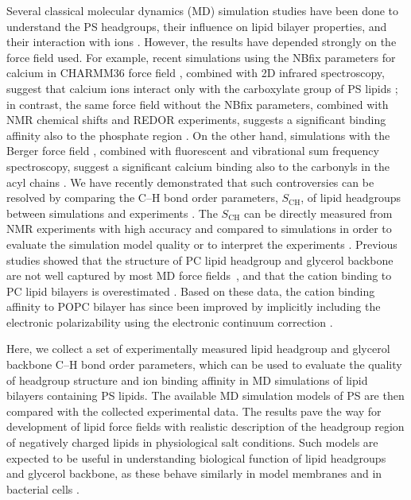 \documentclass[aps,prl,superscriptaddress,twocolumn]{revtex4}
\begin{document}
Several classical molecular dynamics (MD) simulation studies have been done
to understand the PS headgroups, their influence on lipid bilayer properties, and their
interaction with
ions \cite{cascales96,pandit02,mukhopadhyay04,pedersen06,vernier09,boettcher11,molina12,jurkiewicz12,venable13,pan14,vangaveti14,melcrova16,valentine18,hallock18}.
However, the results have depended strongly on the force field used.
For example, recent simulations using the NBfix parameters for calcium \cite{kim16} in
CHARMM36 force field \cite{klauda10,venable13}, combined with 2D infrared spectroscopy,
suggest that calcium ions interact only with the carboxylate group of PS lipids \cite{valentine18}; in contrast,
the same force field without the NBfix parameters, combined with NMR chemical shifts and
REDOR  experiments, suggests a significant binding affinity also to the phosphate region \cite{hallock18}.
On the other hand, simulations with the Berger force field \cite{berger97,mukhopadhyay04},
combined with fluorescent and vibrational sum frequency spectroscopy, suggest a significant
calcium binding also to the carbonyls in the acyl chains \cite{melcrova16}.
We have recently demonstrated that such controversies can be resolved by
comparing the C--H bond order parameters, $S_\mathrm{CH}$, of lipid headgroups between simulations
and experiments \cite{botan15,catte16}. The $S_\mathrm{CH}$ can be directly
measured from NMR experiments with high accuracy and compared to simulations
in order to evaluate the simulation model quality or to interpret the experiments \cite{ollila16}.
Previous studies showed that the structure of PC lipid headgroup and glycerol backbone are not well
captured by most MD force fields~\cite{botan15}, and that the cation binding to PC
lipid bilayers is overestimated \cite{catte16}.
%
Based on these data, the cation binding affinity to POPC bilayer has since been improved by implicitly including the electronic polarizability using the electronic continuum correction \cite{melcr18}.

Here, we collect a set of experimentally measured lipid headgroup and
glycerol backbone C--H bond order parameters, which can be used to
evaluate the quality of headgroup structure and ion binding affinity
in MD simulations of lipid bilayers containing PS lipids. 
The available MD simulation models of PS are then compared with
the collected experimental data.
The results pave the way
for development of lipid force fields with realistic description of
the headgroup region of negatively charged lipids in physiological salt
conditions. Such models are expected to be useful in understanding
biological function of lipid headgroups and glycerol backbone, as
these behave similarly in model membranes and in bacterial cells \cite{gally81,scherer87,seelig90}.
\end{document}
